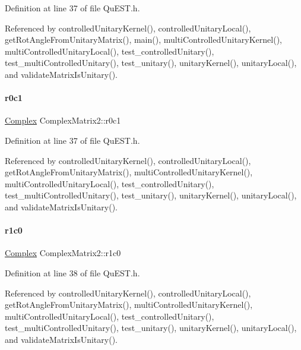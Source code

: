 Definition at line 37 of file Qu\+E\+S\+T.\+h.



Referenced by controlled\+Unitary\+Kernel(), controlled\+Unitary\+Local(), get\+Rot\+Angle\+From\+Unitary\+Matrix(), main(), multi\+Controlled\+Unitary\+Kernel(), multi\+Controlled\+Unitary\+Local(), test\+\_\+controlled\+Unitary(), test\+\_\+multi\+Controlled\+Unitary(), test\+\_\+unitary(), unitary\+Kernel(), unitary\+Local(), and validate\+Matrix\+Is\+Unitary().

\mbox{\label{structComplexMatrix2_a0f3932f055a8b05cef361bce25d51172}} 
\paragraph{\texorpdfstring{r0c1}{r0c1}}
{\footnotesize\ttfamily \mbox{\hyperlink{structComplex}{Complex}} Complex\+Matrix2\+::r0c1}



Definition at line 37 of file Qu\+E\+S\+T.\+h.



Referenced by controlled\+Unitary\+Kernel(), controlled\+Unitary\+Local(), get\+Rot\+Angle\+From\+Unitary\+Matrix(), multi\+Controlled\+Unitary\+Kernel(), multi\+Controlled\+Unitary\+Local(), test\+\_\+controlled\+Unitary(), test\+\_\+multi\+Controlled\+Unitary(), test\+\_\+unitary(), unitary\+Kernel(), unitary\+Local(), and validate\+Matrix\+Is\+Unitary().

\mbox{\label{structComplexMatrix2_ab98282015ed2065e53fbc9638e2583ab}} 
\paragraph{\texorpdfstring{r1c0}{r1c0}}
{\footnotesize\ttfamily \mbox{\hyperlink{structComplex}{Complex}} Complex\+Matrix2\+::r1c0}



Definition at line 38 of file Qu\+E\+S\+T.\+h.



Referenced by controlled\+Unitary\+Kernel(), controlled\+Unitary\+Local(), get\+Rot\+Angle\+From\+Unitary\+Matrix(), multi\+Controlled\+Unitary\+Kernel(), multi\+Controlled\+Unitary\+Local(), test\+\_\+controlled\+Unitary(), test\+\_\+multi\+Controlled\+Unitary(), test\+\_\+unitary(), unitary\+Kernel(), unitary\+Local(), and validate\+Matrix\+Is\+Unitary().

